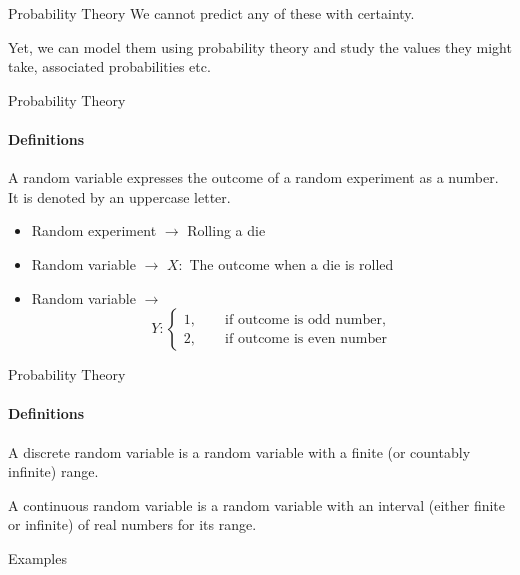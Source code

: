 \documentclass{beamer}\usepackage[]{graphicx}\usepackage[]{color}
\begin{document}
\begin{darkframes}
\begin{frame}[label=lists]{Probability Theory}
      We cannot predict any of these with certainty.  \pause
      
      Yet, we can model them using \alert{probability theory} and study the values they might take, associated probabilities etc.
      
     \end{frame}    


    \begin{frame}[label=lists]{Probability Theory}
		\framesubtitle{Definitions}    
		\begin{definition}
       		A \alert{random variable} expresses the outcome of a \alert{random experiment} as a number. It is denoted by an uppercase letter.
      	\end{definition} 	\pause
      	
      		\begin{itemize}
      			\item Random experiment $\rightarrow$ Rolling a die  \pause
      			\item Random variable $\rightarrow$ $X:$ The outcome when a die is rolled  \pause
				\item Random variable $\rightarrow$ $$ Y : \begin{cases}
        					1, \qquad \text{if outcome is odd number,}  \\
        					2, \qquad \text{if outcome is even number}  
        		            \end{cases}
        		      $$ 
        	\end{itemize}	
	
				
    \end{frame}
    
       
    

    \begin{frame}[label=lists]{Probability Theory}
		\framesubtitle{Definitions}    
      	
      	\begin{definition}
       		A \alert{discrete random variable} is a random variable with a finite (or countably infinite) range.  \pause
       		
       		A \alert{continuous random variable} is a random variable with an interval (either finite or infinite) of real numbers for its range.
      	\end{definition} \pause
    
    
    	\begin{exampleblock}{Examples}
      		\begin{itemize}


\end{itemize}
\end{exampleblock}
\end{frame}
\end{darkframes}
\end{document}
